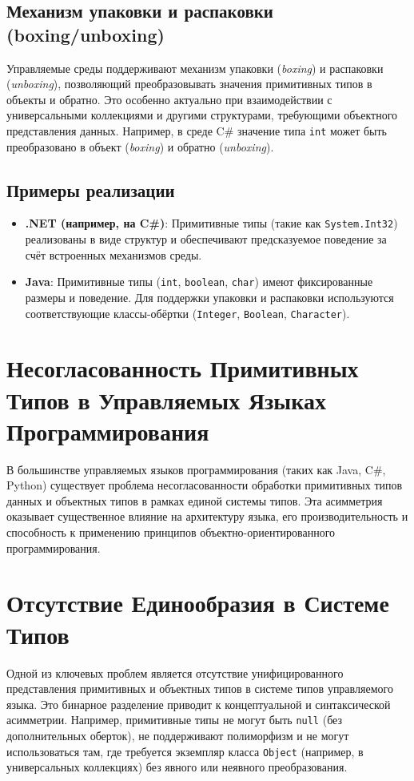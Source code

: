 \subsection*{Механизм упаковки и распаковки (boxing/unboxing)}
Управляемые среды поддерживают механизм упаковки (\textit{boxing}) и распаковки (\textit{unboxing}), позволяющий преобразовывать значения примитивных типов в объекты и обратно.
Это особенно актуально при взаимодействии с универсальными коллекциями и другими структурами, требующими объектного представления данных.
Например, в среде C\# значение типа \verb|int| может быть преобразовано в объект (\textit{boxing}) и обратно (\textit{unboxing}).

\subsection*{Примеры реализации}
\begin{itemize}
    \item \textbf{.NET (например, на C\#)}: Примитивные типы (такие как \verb|System.Int32|) реализованы в виде структур и обеспечивают предсказуемое поведение за счёт встроенных механизмов среды.
    \item \textbf{Java}: Примитивные типы (\verb|int|, \verb|boolean|, \verb|char|) имеют фиксированные размеры и поведение. Для поддержки упаковки и распаковки используются соответствующие классы-обёртки (\verb|Integer|, \verb|Boolean|, \verb|Character|).
\end{itemize}


\section{Несогласованность Примитивных Типов в Управляемых Языках Программирования}

В большинстве управляемых языков программирования (таких как Java, C\#, Python) существует проблема несогласованности обработки примитивных типов данных и объектных типов в рамках единой системы типов. Эта асимметрия оказывает существенное влияние на архитектуру языка, его производительность и способность к применению принципов объектно-ориентированного программирования.

\section{Отсутствие Единообразия в Системе Типов}
Одной из ключевых проблем является отсутствие унифицированного представления примитивных и объектных типов в системе типов управляемого языка.
Это бинарное разделение приводит к концептуальной и синтаксической асимметрии. Например, примитивные типы не могут быть \texttt{null} (без дополнительных оберток), не поддерживают полиморфизм и не могут использоваться там, где требуется экземпляр класса \texttt{Object} (например, в универсальных коллекциях) без явного или неявного преобразования.

